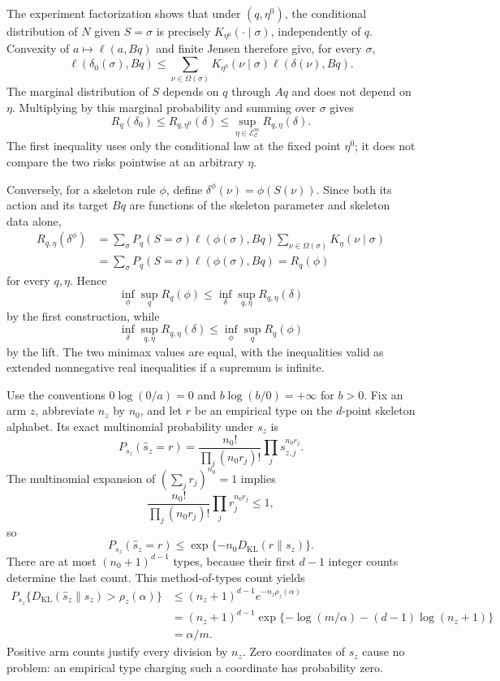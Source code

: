 The experiment factorization shows that under \((q,\eta^0)\), the conditional distribution of \(N\) given \(S=\sigma\) is precisely \(K_{\eta^0}(\cdot\mid\sigma)\), independently of \(q\).  Convexity of \(a\mapsto\ell(a,Bq)\) and finite Jensen therefore give, for every \(\sigma\),
\[
\ell(\delta_0(\sigma),Bq)
\le
\sum_{\nu\in\Omega(\sigma)}K_{\eta^0}(\nu\mid\sigma)
\ell(\delta(\nu),Bq).
\]
The marginal distribution of \(S\) depends on \(q\) through \(Aq\) and does not depend on \(\eta\).  Multiplying by this marginal probability and summing over \(\sigma\) gives
\[
R_q(\delta_0)
\le R_{q,\eta^0}(\delta)
\le\sup_{\eta\in\mathcal E_{\mathcal C}^m}R_{q,\eta}(\delta).
\]
The first inequality uses only the conditional law at the fixed point \(\eta^0\); it does not compare the two risks pointwise at an arbitrary \(\eta\).

Conversely, for a skeleton rule \(\phi\), define \(\delta^\phi(\nu)=\phi(S(\nu))\).  Since both its action and its target \(Bq\) are functions of the skeleton parameter and skeleton data alone,
\[
\begin{aligned}
R_{q,\eta}(\delta^\phi)
 &=\sum_{\sigma}P_q(S=\sigma)\ell(\phi(\sigma),Bq)
   \sum_{\nu\in\Omega(\sigma)}K_\eta(\nu\mid\sigma)\\
 &=\sum_{\sigma}P_q(S=\sigma)\ell(\phi(\sigma),Bq)
 =R_q(\phi)
\end{aligned}
\]
for every \(q,\eta\).  Hence
\[
\inf_\phi\sup_qR_q(\phi)
\le\inf_\delta\sup_{q,\eta}R_{q,\eta}(\delta)
\]
by the first construction, while
\[
\inf_\delta\sup_{q,\eta}R_{q,\eta}(\delta)
\le\inf_\phi\sup_qR_q(\phi)
\]
by the lift.  The two minimax values are equal, with the inequalities valid as extended nonnegative real inequalities if a supremum is infinite.

Use the conventions \(0\log(0/a)=0\) and \(b\log(b/0)=+\infty\) for \(b>0\).  Fix an arm \(z\), abbreviate \(n_z\) by \(n_0\), and let \(r\) be an empirical type on the \(d\)-point skeleton alphabet.  Its exact multinomial probability under \(s_z\) is
\[
P_{s_z}(\widehat s_z=r)
=\frac{n_0!}{\prod_j(n_0r_j)!}\prod_js_{z,j}^{n_0r_j}.
\]
The multinomial expansion of \((\sum_jr_j)^{n_0}=1\) implies
\[
\frac{n_0!}{\prod_j(n_0r_j)!}\prod_jr_j^{n_0r_j}\le1,
\]
so
\[
P_{s_z}(\widehat s_z=r)
\le \exp\{-n_0D_{\mathrm{KL}}(r\|s_z)\}.
\]
There are at most \((n_0+1)^{d-1}\) types, because their first \(d-1\) integer counts determine the last count.  This method-of-types count yields
\[
\begin{aligned}
P_{s_z}\{D_{\mathrm{KL}}(\widehat s_z\|s_z)>\rho_z(\alpha)\}
&\le(n_z+1)^{d-1}e^{-n_z\rho_z(\alpha)}\\
&=(n_z+1)^{d-1}
\exp\{-\log(m/\alpha)-(d-1)\log(n_z+1)\}\\
&=\alpha/m.
\end{aligned}
\]
Positive arm counts justify every division by \(n_z\).  Zero coordinates of \(s_z\) cause no problem: an empirical type charging such a coordinate has probability zero.

